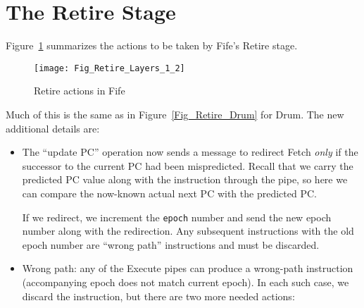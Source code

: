 \section{The Retire Stage}

\label{Sec_Fife_Retire_Principles}

Figure~\ref{Fig_Fife_Retire} summarizes the actions to be taken by
Fife's Retire stage.

\begin{figure}[htbp]
  \centerline{\texttt{[image: Fig\_Retire\_Layers\_1\_2]}}
  \caption{\label{Fig_Fife_Retire}Retire actions in Fife}
\end{figure}

Much of this is the same as in Figure~\ref{Fig_Retire_Drum} for Drum.
The new additional details are:

\begin{itemize}

 \item The ``update PC'' operation now sends a message to redirect
       Fetch \emph{only} if the successor to the current PC had been
       mispredicted.  Recall that we carry the predicted PC value
       along with the instruction through the pipe, so here we can
       compare the now-known actual next PC with the predicted PC.

       If we redirect, we increment the \verb|epoch| number and send
       the new epoch number along with the redirection.  Any
       subsequent instructions with the old epoch number are ``wrong
       path'' instructions and must be discarded.

 \item Wrong path: any of the Execute pipes can produce a wrong-path
       instruction (accompanying epoch does not match current epoch).
       In each such case, we discard the instruction, but there are two more needed actions:

\end{itemize}
